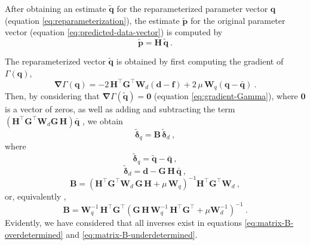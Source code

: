 After obtaining an estimate $\tilde{\mathbf{q}}$ for the reparameterized parameter vector $\mathbf{q}$ (equation \ref{eq:reparameterization}), 
the estimate $\tilde{\mathbf{p}}$ for the original parameter vector 
(equation \ref{eq:predicted-data-vector}) is computed by 
\begin{equation}
	\tilde{\mathbf{p}} = \mathbf{H} \, \tilde{\mathbf{q}} \: .
	\label{eq:vector-p-tilde}
\end{equation}

The reparameterized vector $\tilde{\mathbf{q}}$ is obtained by first computing the gradient of $\Gamma(\mathbf{q})$,
\begin{equation}
	\boldsymbol{\nabla} \Gamma(\mathbf{q}) = 
	-2 \, \mathbf{H}^{\top}\mathbf{G}^{\top} \mathbf{W}_{d} \left(\mathbf{d} - \mathbf{f} \right) +
	2 \, \mu \, \mathbf{W}_{q} \left( \mathbf{q} - \bar{\mathbf{q}} \right) \: .
	\label{eq:gradient-Gamma}
\end{equation}
Then, by considering that $\boldsymbol{\nabla} \Gamma(\tilde{\mathbf{q}}) = \mathbf{0}$ (equation \ref{eq:gradient-Gamma}),
where $\mathbf{0}$ is a vector of zeros, as well as adding and subtracting the term
$\left( \mathbf{H}^{\top}\mathbf{G}^{\top}\mathbf{W}_{d} \mathbf{G} \, \mathbf{H} \right) \bar{\mathbf{q}}$ ,
we obtain
\begin{equation}
	\tilde{\boldsymbol{\delta}}_{q} = \mathbf{B} \, \tilde{\boldsymbol{\delta}}_{d} \: ,
	\label{eq:vector-q-tilde}
\end{equation}
where 
\begin{equation}
	\tilde{\boldsymbol{\delta}}_{q} = \tilde{\mathbf{q}} - \bar{\mathbf{q}} \: ,
	\label{eq:delta-q-tilde}
\end{equation}
\begin{equation}
	\tilde{\boldsymbol{\delta}}_{d} = \mathbf{d} - \mathbf{G} \, \mathbf{H} \, \bar{\mathbf{q}} \: ,
	\label{eq:delta-d}
\end{equation}
\begin{equation}
	\mathbf{B} = \left( \mathbf{H}^{\top} \mathbf{G}^{\top} \mathbf{W}_{d} \, \mathbf{G} \, \mathbf{H} + 
	\mu \, \mathbf{W}_{q} \right)^{-1}
	\mathbf{H}^{\top} \mathbf{G}^{\top} \mathbf{W}_{d} \: ,
	\label{eq:matrix-B-overdetermined}
\end{equation}
or, equivalently \cite[][p. 62]{menke2018},
\begin{equation}
	\mathbf{B} = \mathbf{W}_{q}^{-1} \, \mathbf{H}^{\top} \mathbf{G}^{\top}
	\left( \mathbf{G} \, \mathbf{H} \, \mathbf{W}_{q}^{-1} \,
	\mathbf{H}^{\top}\mathbf{G}^{\top} + \mu \mathbf{W}_{d}^{-1} \right)^{-1} \: .
	\label{eq:matrix-B-underdetermined}
\end{equation}
Evidently, we have considered that all inverses exist in equations \ref{eq:matrix-B-overdetermined} and \ref{eq:matrix-B-underdetermined}.

